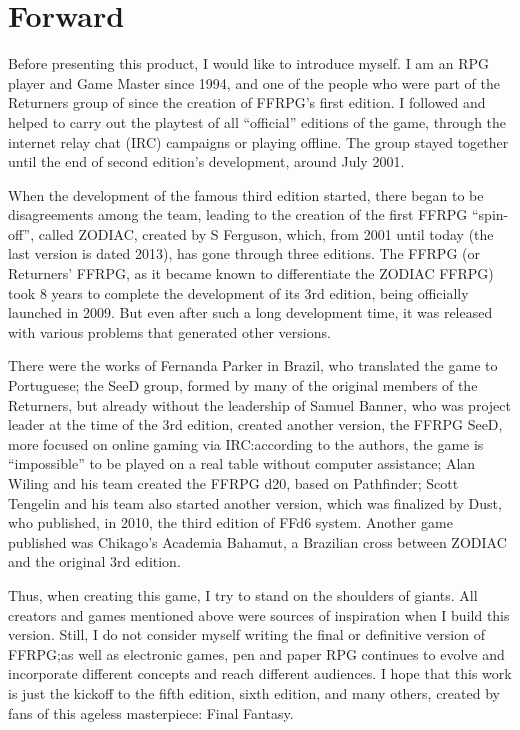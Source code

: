 
\begin{center}
\end{center}
\section{Forward}\label{sec:forward}
\begin{multicols}{2}
Before presenting this product, I would like to introduce myself. I am an RPG player and Game Master since 1994, and one of the people who were part of the Returners group of since the creation of FFRPG’s first edition. I followed and helped to carry out the playtest of all “official” editions of the game, through the internet relay chat (IRC) campaigns or playing offline. The group stayed together until the end of second edition’s development, around July 2001.

When the development of the famous third edition started, there began to be disagreements among the team, leading to the creation of the first FFRPG “spin-off”, called ZODIAC, created by S Ferguson, which, from 2001 until today (the last version is dated 2013), has gone through three editions. The FFRPG (or Returners' FFRPG, as it became known to differentiate the ZODIAC FFRPG) took 8 years to complete the development of its 3rd edition, being officially launched in 2009. But even after such a long development time, it was released with various problems that generated other versions.

There were the works of Fernanda Parker in Brazil, who translated the game to Portuguese; the SeeD group, formed by many of the original members of the Returners, but already without the leadership of Samuel Banner, who was project leader at the time of the 3rd edition, created another version, the FFRPG SeeD, more focused on online gaming via IRC:\@{}according to the authors, the game is “impossible” to be played on a real table without computer assistance; Alan Wiling and his team created the FFRPG d20, based on Pathfinder; Scott Tengelin and his team also started another version, which was finalized by Dust, who published, in 2010, the third edition of FFd6 system. Another game published was Chikago’s Academia Bahamut, a Brazilian cross between ZODIAC and the original 3rd edition.

Thus, when creating this game, I try to stand on the shoulders of giants. All creators and games mentioned above were sources of inspiration when I build this version. Still, I do not consider myself writing the final or definitive version of FFRPG;\@{}as well as electronic games, pen and paper RPG continues to evolve and incorporate different concepts and reach different audiences. I hope that this work is just the kickoff to the fifth edition, sixth edition, and many others, created by fans of this ageless masterpiece: Final Fantasy.


\end{multicols}
